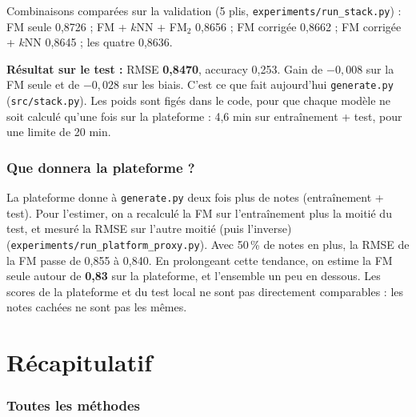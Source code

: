 \documentclass[11pt,a4paper]{article}
\newcommand{\resultat}[1]{\par\textbf{Résultat sur le test :} #1\par}
\begin{document}
Combinaisons comparées sur la validation (5 plis, \texttt{experiments/run\_stack.py}) :
FM seule 0,8726 ; FM + $k$NN + FM$_2$ 0,8656 ; FM corrigée 0,8662 ; FM corrigée + $k$NN
0,8645 ; les quatre 0,8636.

\resultat{RMSE \textbf{0,8470}, accuracy 0,253. Gain de $-0{,}008$ sur la FM seule et de
$-0{,}028$ sur les biais. C'est ce que fait aujourd'hui \texttt{generate.py}
(\texttt{src/stack.py}). Les poids sont figés dans le code, pour que chaque modèle ne soit
calculé qu'une fois sur la plateforme : 4,6 min sur entraînement + test, pour une limite de 20 min.}

\section{Que donnera la plateforme ?}

La plateforme donne à \texttt{generate.py} deux fois plus de notes (entraînement + test).
Pour l'estimer, on a recalculé la FM sur l'entraînement plus la moitié du test, et mesuré
la RMSE sur l'autre moitié (puis l'inverse) (\texttt{experiments/run\_platform\_proxy.py}).
Avec 50\,\% de notes en plus, la RMSE de la FM passe de 0,855 à 0,840. En prolongeant cette
tendance, on estime la FM seule autour de \textbf{0,83} sur la plateforme, et l'ensemble un
peu en dessous. Les scores de la plateforme et du test local ne sont pas directement
comparables : les notes cachées ne sont pas les mêmes.

\part{Récapitulatif}

\section{Toutes les méthodes}
\end{document}
